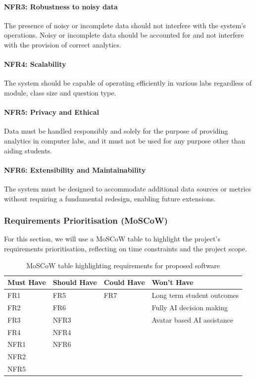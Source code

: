 \paragraph{NFR3: Robustness to noisy data}
The presence of noisy or incomplete data should not interfere with the system's operations. Noisy or incomplete data should be accounted for and not interfere with the provision of correct analytics.

\paragraph{NFR4: Scalability}
The system should be capable of operating efficiently in various labs regardless of module, class size and question type.

\paragraph{NFR5: Privacy and Ethical}
Data must be handled responsibly and solely for the purpose of providing analytics in computer labs, and it must not be used for any purpose other than aiding students.

\paragraph{NFR6: Extensibility and Maintainability}
The system must be designed to accommodate additional data sources or metrics without requiring a fundamental redesign, enabling future extensions.


\subsubsection{Requirements Prioritisation (MoSCoW)}
For this section, we will use a MoSCoW table to highlight the project's requirements prioritisation, reflecting on time constraints and the project scope.



\begin{table}[H]
    \centering
    \begin{tabular}{|p{}|p{}|p{}|p{}|}
        \hline
        Must Have & Should Have & Could Have & Won't Have \\
        \hline
        \hline
        FR1& FR5 & FR7 & Long term student outcomes\\
        \hline
        FR2& FR6 &  & Fully AI decision making\\
        \hline
        FR3& NFR3 &  & Avatar based AI assistance\\
        \hline
        FR4& NFR4 &  & \\
        \hline
        NFR1& NFR6 &  & \\
        \hline
        NFR2&  &  & \\
        \hline
        NFR5&  &  & \\
        \hline

    \end{tabular}
    \caption{MoSCoW table highlighting requirements for proposed software}
    \label{tab: MosCoW}
\end{table}

